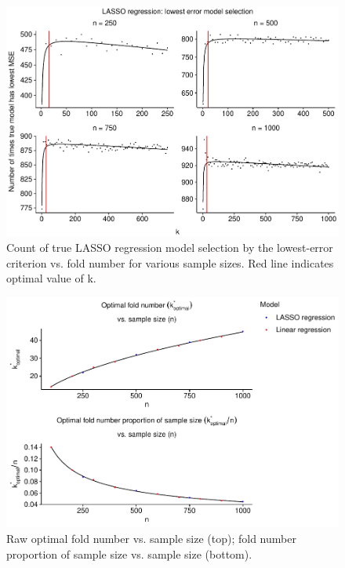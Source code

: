 \documentclass[
  12pt,
]{article}
\begin{document}
\begin{figure}[H]

{\centering \includegraphics{manuscript_files/figure-latex/unnamed-chunk-8-1} 

}

\caption{Count of true LASSO regression model selection by the lowest-error criterion vs. fold number for various sample sizes. Red line indicates optimal value of k.}\label{fig:unnamed-chunk-8}
\end{figure}

\begin{figure}[H]

{\centering \includegraphics{manuscript_files/figure-latex/unnamed-chunk-9-1} 

}

\caption{Raw optimal fold number vs. sample size (top); fold number proportion of sample size vs. sample size (bottom).}\label{fig:unnamed-chunk-9}
\end{figure}
\end{document}
